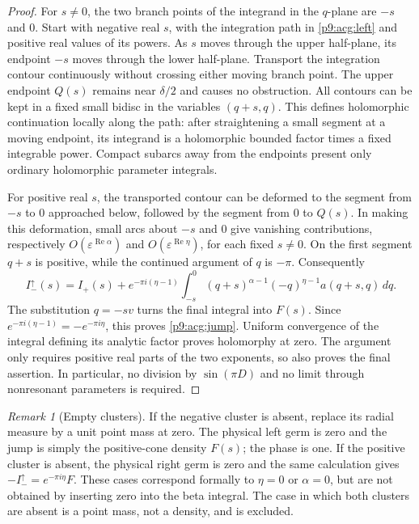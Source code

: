 \documentclass[11pt,a4paper]{article}
\theoremstyle{definition}
\theoremstyle{remark}
\newtheorem{remark}[theorem]{Remark}
\numberwithin{equation}{section}
\begin{document}
\begin{proof}
For $s\ne0$, the two branch points of the integrand in the $q$-plane
are $-s$ and $0$. Start with negative real $s$, with the integration
path in \eqref{p9:acg:left} and positive real values of its powers. As
$s$ moves through the upper half-plane, its endpoint $-s$ moves through
the lower half-plane. Transport the integration contour continuously
without crossing either moving branch point. The upper endpoint
$Q(s)$ remains near $\delta/2$ and causes no obstruction. All contours
can be kept in a fixed small bidisc in the variables $(q+s,q)$.
This defines holomorphic continuation locally along the path: after
straightening a small segment at a moving endpoint, its integrand is
a holomorphic bounded factor times a fixed integrable power. Compact
subarcs away from the endpoints present only ordinary holomorphic
parameter integrals.

For positive real $s$, the transported contour can be deformed to
the segment from $-s$ to $0$ approached below, followed by the segment
from $0$ to $Q(s)$. In making this deformation, small arcs about $-s$
and $0$ give vanishing contributions, respectively
$O(\varepsilon^{\operatorname{Re}\alpha})$ and
$O(\varepsilon^{\operatorname{Re}\eta})$, for each fixed $s\ne0$.
On the first segment $q+s$ is positive, while the continued argument
of $q$ is $-\pi$. Consequently
\[
 I_-^\uparrow(s)=I_+(s)+e^{-\pi i(\eta-1)}
  \int_{-s}^0(q+s)^{\alpha-1}(-q)^{\eta-1}a(q+s,q)\,dq.
\]
The substitution $q=-sv$ turns the final integral into $F(s)$.
Since $e^{-\pi i(\eta-1)}=-e^{-\pi i\eta}$, this proves
\eqref{p9:acg:jump}. Uniform convergence of the integral defining its
analytic factor proves holomorphy at zero. The argument only requires
positive real parts of the two exponents, so also proves the final
assertion. In particular, no division by $\sin(\pi D)$ and no limit
through nonresonant parameters is required.
\end{proof}

\begin{remark}[Empty clusters]\label{p9:acg:empty}
If the negative cluster is absent, replace its radial measure by a
unit point mass at zero. The physical left germ is zero and the jump
is simply the positive-cone density $F(s)$; the phase is one. If the
positive cluster is absent, the physical right germ is zero and the
same calculation gives $-I_-^\uparrow=e^{-\pi i\eta}F$.
These cases correspond formally to $\eta=0$ or $\alpha=0$, but are
not obtained by inserting zero into the beta integral. The case in
which both clusters are absent is a point mass, not a density, and is
excluded.
\end{remark}
\end{document}
